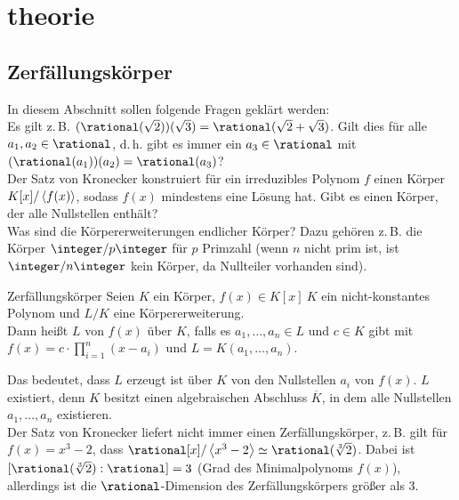 \chapter{%
    theorie%
}

\section{%
    Zerfällungskörper%
}

\begin{Bem}
    In diesem Abschnitt sollen folgende Fragen geklärt werden:\\
    Es gilt z.\,B. $(\rational(\sqrt{2}))(\sqrt{3}) =
    \rational(\sqrt{2} + \sqrt{3})$.
    Gilt dies für alle $a_1, a_2 \in \rational$, d.\,h. gibt es immer
    ein $a_3 \in \rational$ mit $(\rational(a_1))(a_2) = \rational(a_3)$?\\
    Der Satz von Kronecker konstruiert für ein irreduzibles Polynom $f$
    einen Körper $K[x]/\left\langle f(x)\right\rangle$, sodass $f(x)$ mindestens eine Lösung
    hat.
    Gibt es einen Körper, der alle Nullstellen enthält?\\
    Was sind die Körpererweiterungen endlicher Körper?
    Dazu gehören z.\,B. die Körper $\integer/p\integer$ für
    $p$ Primzahl
    (wenn $n$ nicht prim ist, ist $\integer/n\integer$ kein Körper, da
    Nullteiler vorhanden sind).
\end{Bem}

\linie

\begin{Def}{Zerfällungskörper}
    Seien $K$ ein Körper,
    $f(x) \in K[x] \ K$ ein nicht-konstantes Polynom und
    $L/K$ eine Körpererweiterung.\\
    Dann heißt $L$  von $f(x)$ über $K$, falls
    es $a_1, \dotsc, a_n \in L$ und $c \in K$ gibt mit\\
    $f(x) = c \cdot \prod_{i=1}^n (x - a_i)$ und
    $L = K(a_1, \dotsc, a_n)$.
\end{Def}

\begin{Bem}
    Das bedeutet, dass $L$ erzeugt ist über $K$ von den Nullstellen $a_i$ von
    $f(x)$.
    $L$ existiert, denn $K$ besitzt einen algebraischen Abschluss
    $\overline{K}$, in dem alle Nullstellen $a_1, \dotsc, a_n$ existieren.\\
    Der Satz von Kronecker liefert nicht immer einen Zerfällungskörper,
    z.\,B. gilt für $f(x) = x^3 - 2$, dass
    $\rational[x]/\erzeugnis{x^3 - 2} \simeq \rational(\sqrt[3]{2})$.
    Dabei ist $[\rational(\sqrt[3]{2}) : \rational] = 3$
    (Grad des Minimalpolynoms $f(x)$), allerdings
    ist die $\rational$-Dimension des Zerfällungskörpers größer als $3$.
\end{Bem}

